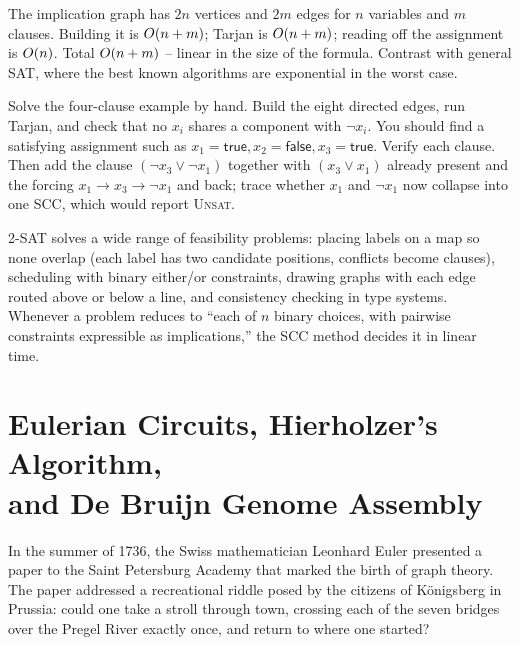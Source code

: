 \begin{complexitybox}
The implication graph has $2n$ vertices and $2m$ edges for $n$ variables and $m$ clauses. Building it is $O(n+m)$; Tarjan is $O(n+m)$; reading off the assignment is $O(n)$. Total $O(n+m)$ -- linear in the size of the formula. Contrast with general SAT, where the best known algorithms are exponential in the worst case.
\end{complexitybox}

\begin{labbox}
Solve the four-clause example by hand. Build the eight directed edges, run Tarjan, and check that no $x_i$ shares a component with $\lnot x_i$. You should find a satisfying assignment such as $x_1=\textsf{true}, x_2=\textsf{false}, x_3=\textsf{true}$. Verify each clause. Then add the clause $(\lnot x_3\lor\lnot x_1)$ together with $(x_3\lor x_1)$ already present and the forcing $x_1\to x_3\to\lnot x_1$ and back; trace whether $x_1$ and $\lnot x_1$ now collapse into one SCC, which would report \textsc{Unsat}.
\end{labbox}

\begin{applicationbox}
2-SAT solves a wide range of feasibility problems: placing labels on a map so none overlap (each label has two candidate positions, conflicts become clauses), scheduling with binary either/or constraints, drawing graphs with each edge routed above or below a line, and consistency checking in type systems. Whenever a problem reduces to ``each of $n$ binary choices, with pairwise constraints expressible as implications,'' the SCC method decides it in linear time.
\end{applicationbox}

\section[Eulerian Circuits, Hierholzer's Algorithm, and De Bruijn Genome Assembly]{Eulerian Circuits, Hierholzer's Algorithm,\\ and De Bruijn Genome Assembly}
\label{ch05:eulerian}

In the summer of 1736, the Swiss mathematician Leonhard Euler presented a paper to the Saint Petersburg Academy that marked the birth of graph theory. The paper addressed a recreational riddle posed by the citizens of K{\"o}nigsberg in Prussia: could one take a stroll through town, crossing each of the seven bridges over the Pregel River exactly once, and return to where one started?

